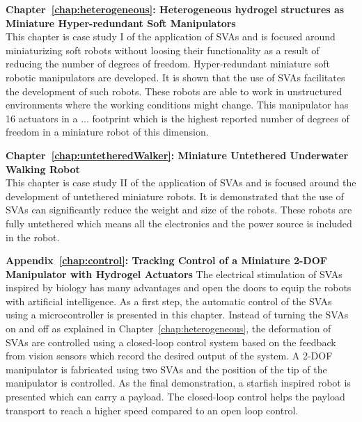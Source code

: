\textbf{Chapter~\ref{chap:heterogeneous}: Heterogeneous hydrogel structures as Miniature Hyper-redundant Soft Manipulators}\\
This chapter is case study I of the application of SVAs and is focused around miniaturizing soft robots without loosing their functionality as a result of reducing the number of degrees of freedom. Hyper-redundant miniature soft robotic manipulators are developed. It is shown that the use of SVAs facilitates the development of such robots. These robots are able to work in unstructured environments where the working conditions might change. This manipulator has 16 actuators in a ... footprint which is the highest reported number of degrees of freedom in a miniature robot of this dimension.

\textbf{Chapter~\ref{chap:untetheredWalker}: Miniature Untethered Underwater Walking Robot}\\
This chapter is case study II of the application of SVAs and is focused around the development of untethered miniature robots. It is demonstrated that the use of SVAs can significantly reduce the weight and size of the robots. These robots are fully untethered which means all the electronics and the power source is included in the robot. 

\textbf{Appendix~\ref{chap:control}: Tracking Control of a Miniature 2-DOF Manipulator with Hydrogel Actuators}
The electrical stimulation of SVAs inspired by biology has many advantages and open the doors to equip the robots with artificial intelligence. As a first step, the automatic control of the SVAs using a microcontroller is presented in this chapter. Instead of turning the SVAs on and off as explained in Chapter~\ref{chap:heterogeneous}, the deformation of SVAs are controlled using a closed-loop control system based on the feedback from vision sensors which record the desired output of the system. A 2-DOF manipulator is fabricated using two SVAs and the position of the tip of the manipulator is controlled. As the final demonstration, a starfish inspired robot is presented which can carry a payload. The closed-loop control helps the payload transport to reach a higher speed compared to an open loop control. 

